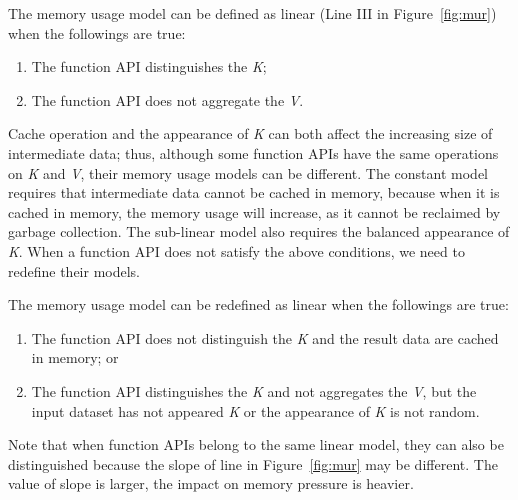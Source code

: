 \begin{lemma}[Linear] The memory usage model can be defined as linear (Line III in Figure~\ref{fig:mur}) when the followings are true:
\begin{enumerate}
\item The function API distinguishes the \textit{K};
\item The function API does not aggregate the \textit{V}.
\end{enumerate}
\end{lemma}

Cache operation and the appearance of \textit{K} can both affect the increasing size of intermediate data; thus, although some function APIs have the same operations on \textit{K} and \textit{V}, their memory usage models can be different. The constant model requires that intermediate data cannot be cached in memory, because when it is cached in memory, the memory usage will increase, as it cannot be reclaimed by garbage collection. The sub-linear model also requires the balanced appearance of \textit{K}. When a function API does not satisfy the above conditions, we need to redefine their models.

\begin{lemma}[Linear] The memory usage model can be redefined as linear when the followings are true:
\begin{enumerate}
\item The function API does not distinguish the \textit{K} and the result data are cached in memory; or
\item The function API distinguishes the \textit{K} and not aggregates the \textit{V}, but the input dataset has not appeared \textit{K} or the appearance of \textit{K} is not random.
\end{enumerate}
\end{lemma}

Note that when function APIs belong to the same linear model, they can also be distinguished because the slope of line in Figure~\ref{fig:mur} may be different. The value of slope is larger, the impact on memory pressure is heavier.


